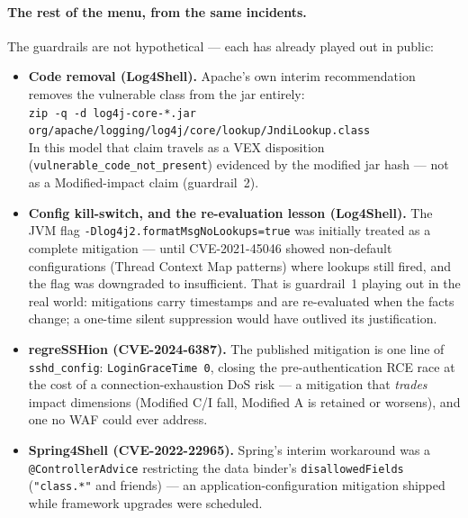 \documentclass[11pt]{article}
\newcommand{\code}[1]{\texttt{#1}}
\begin{document}
\paragraph{The rest of the menu, from the same incidents.} The guardrails are not
hypothetical --- each has already played out in public:
\begin{itemize}[leftmargin=1.4em,nosep,topsep=3pt]
\item \textbf{Code removal (Log4Shell).} Apache's own interim recommendation
  removes the vulnerable class from the jar entirely:\\[2pt]
  {\footnotesize\code{zip -q -d log4j-core-*.jar org/apache/logging/log4j/core/lookup/JndiLookup.class}}\\[2pt]
  In this model that claim travels as a VEX disposition
  (\code{vulnerable\_code\_not\_present}) evidenced by the modified jar hash --- not
  as a Modified-impact claim (guardrail~2).
\item \textbf{Config kill-switch, and the re-evaluation lesson (Log4Shell).} The
  JVM flag \code{-Dlog4j2.formatMsgNoLookups=true} was initially treated as a
  complete mitigation --- until CVE-2021-45046 showed non-default configurations (Thread
  Context Map patterns) where lookups still fired, and the flag was downgraded to
  insufficient. That is guardrail~1 playing out in the real world: mitigations carry
  timestamps and are re-evaluated when the facts change; a one-time silent
  suppression would have outlived its justification.
\item \textbf{regreSSHion (CVE-2024-6387).} The published mitigation is one line of
  \code{sshd\_config}: \code{LoginGraceTime 0}, closing the pre-authentication RCE
  race at the cost of a connection-exhaustion DoS risk --- a mitigation that
  \emph{trades} impact dimensions (Modified C/I fall, Modified A is retained or
  worsens), and one no WAF could ever address.
\item \textbf{Spring4Shell (CVE-2022-22965).} Spring's interim workaround was a
  \code{@ControllerAdvice} restricting the data binder's \code{disallowedFields}
  (\code{"class.*"} and friends) --- an application-configuration mitigation shipped
  while framework upgrades were scheduled.
\end{itemize}
\end{document}
